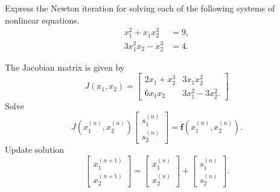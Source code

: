 \begin{pro}
  Express the Newton iteration for solving each of the following
  systems of nonlinear equations.
  \begin{align*}
    x_1^2 + x_1x_2^3 &= 9, \\
    3x_1^2x_2 - x_2^3 &= 4.
  \end{align*}
\end{pro}

\begin{sol}
  The Jacobian matrix is given by
  \begin{displaymath}
    J(x_1, x_2) =
    \begin{bmatrix}
      2x_1 + x_2^3 & 3x_1x_2^2 \\
      6x_1x_2 & 3x_1^2 - 3x_2^2.
    \end{bmatrix}
  \end{displaymath}
  Solve
    \begin{displaymath}
      J(x_1^{(n)}, x_2^{(n)})
      \begin{bmatrix}
        s_1^{(n)} \\
        s_2^{(n)}
      \end{bmatrix}
      = \mathbf{f}(x_1^{(n)}, x_2^{(n)}).
    \end{displaymath}
    Update solution
    \begin{displaymath}
      \begin{bmatrix}
        x_1^{(n+1)} \\
        x_2^{(n+1)}
      \end{bmatrix}
      =
      \begin{bmatrix}
        x_1^{(n)} \\
        x_2^{(n)}
      \end{bmatrix}
      +
      \begin{bmatrix}
        s_1^{(n)} \\
        s_2^{(n)}
      \end{bmatrix}.
    \end{displaymath}
\end{sol}
